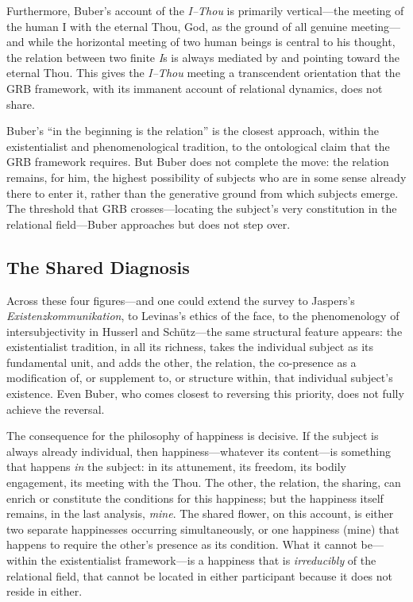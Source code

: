 Furthermore, Buber's account of the \emph{I--Thou} is primarily vertical---the meeting of the human I with the eternal Thou, God, as the ground of all genuine meeting---and while the horizontal meeting of two human beings is central to his thought, the relation between two finite \emph{I}s is always mediated by and pointing toward the eternal Thou. This gives the \emph{I--Thou} meeting a transcendent orientation that the GRB framework, with its immanent account of relational dynamics, does not share.

\begin{claim}
Buber's ``in the beginning is the relation'' is the closest approach, within the existentialist and phenomenological tradition, to the ontological claim that the GRB framework requires. But Buber does not complete the move: the relation remains, for him, the highest possibility of subjects who are in some sense already there to enter it, rather than the generative ground from which subjects emerge. The threshold that GRB crosses---locating the subject's very constitution in the relational field---Buber approaches but does not step over.
\end{claim}

\subsection{The Shared Diagnosis}
\label{p14:subsec:existdiagnosis}

\noindent
Across these four figures---and one could extend the survey to Jaspers's \emph{Existenzkommunikation}, to Levinas's ethics of the face, to the phenomenology of intersubjectivity in Husserl and Schütz---the same structural feature appears: the existentialist tradition, in all its richness, takes the individual subject as its fundamental unit, and adds the other, the relation, the co-presence as a modification of, or supplement to, or structure within, that individual subject's existence. Even Buber, who comes closest to reversing this priority, does not fully achieve the reversal.

The consequence for the philosophy of happiness is decisive. If the subject is always already individual, then happiness---whatever its content---is something that happens \emph{in} the subject: in its attunement, its freedom, its bodily engagement, its meeting with the Thou. The other, the relation, the sharing, can enrich or constitute the conditions for this happiness; but the happiness itself remains, in the last analysis, \emph{mine}. The shared flower, on this account, is either two separate happinesses occurring simultaneously, or one happiness (mine) that happens to require the other's presence as its condition. What it cannot be---within the existentialist framework---is a happiness that is \emph{irreducibly} of the relational field, that cannot be located in either participant because it does not reside in either.

